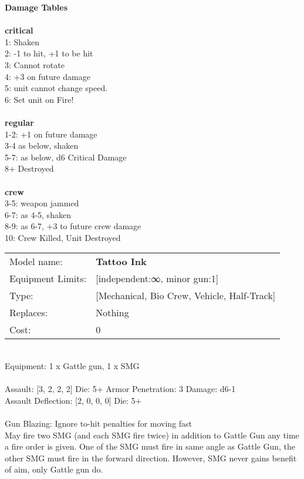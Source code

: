 {\bf Damage Tables} \\
\ \\ {\bf critical } \\
1: Shaken \\
2: -1 to hit, +1 to be hit \\
3: Cannot rotate \\
4: +3 on future damage \\
5: unit cannot change speed. \\
6: Set unit on Fire! \\
\ \\ {\bf regular } \\
1-2: +1 on future damage \\
3-4 as below, shaken \\
5-7: as below, d6 Critical Damage \\
8+ Destroyed \\
\ \\ {\bf crew } \\
3-5: weapon jammed \\
6-7: as 4-5, shaken \\
8-9: as 6-7, +3 to future crew damage \\
10: Crew Killed, Unit Destroyed \\


\noindent
\begin{tabular}{ll}
Model name: &{\bf Tattoo Ink } \\
Equipment Limits: &[independent:∞, minor gun:1] \\
Type: &[Mechanical, Bio Crew, Vehicle, Half-Track] \\
Replaces: &Nothing \\
Cost: & 0\\
\end{tabular}
\ \\
Equipment: 1 x Gattle gun, 1 x SMG \\
\ \\
Assault: [3, 2, 2, 2] Die: 5+ Armor Penetration: 3 Damage: d6-1 \\
Assault Deflection: [2, 0, 0, 0] Die: 5+\\
\indent  
\ \\
Gun Blazing: Ignore to-hit penalties for moving fast\\ 
May fire two SMG (and each SMG fire twice) in addition to Gattle Gun any time a fire order is given. One of the SMG must fire in same angle as Gattle Gun, the other SMG must fire in the forward direction. However, SMG never gains benefit of aim, only Gattle gun do.\\ 

